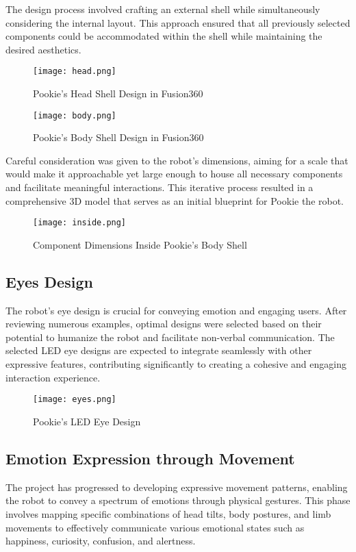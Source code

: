 The design process involved crafting an external shell while simultaneously considering the internal layout. This approach ensured that all previously selected components could be accommodated within the shell while maintaining the desired aesthetics.

\begin{figure}[ht]
    \centering
    \captionsetup{justification=centering}
    \texttt{[image: head.png]}
    \caption{Pookie’s Head Shell Design in Fusion360}
    \label{fig:head}
\end{figure}

\begin{figure}[ht]
    \centering
    \captionsetup{justification=centering}
    \texttt{[image: body.png]}
    \caption{Pookie’s Body Shell Design in Fusion360}
    \label{fig:body}
\end{figure}

Careful consideration was given to the robot's dimensions, aiming for a scale that would make it approachable yet large enough to house all necessary components and facilitate meaningful interactions. This iterative process resulted in a comprehensive 3D model that serves as an initial blueprint for Pookie the robot. 

\begin{figure}[ht]
    \centering
    \captionsetup{justification=centering}
    \texttt{[image: inside.png]}
    \caption{Component Dimensions Inside Pookie’s Body Shell}
    \label{fig:inside}
\end{figure}

\newpage
\subsection{Eyes Design}
The robot's eye design is crucial for conveying emotion and engaging users. After reviewing numerous examples, optimal designs were selected based on their potential to humanize the robot and facilitate non-verbal communication. The selected LED eye designs are expected to integrate seamlessly with other expressive features, contributing significantly to creating a cohesive and engaging interaction experience.
\begin{figure}[ht]
    \centering
    \captionsetup{justification=centering}
    \texttt{[image: eyes.png]}
    \caption{Pookie's LED Eye Design}
    \label{fig:eyes}
\end{figure}

\subsection{Emotion Expression through Movement}
The project has progressed to developing expressive movement patterns, enabling the robot to convey a spectrum of emotions through physical gestures. This phase involves mapping specific combinations of head tilts, body postures, and limb movements to effectively communicate various emotional states such as happiness, curiosity, confusion, and alertness. 
